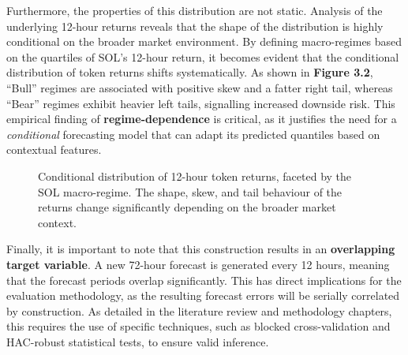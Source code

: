 \documentclass[
  a4paper,
  DIV=11,
  numbers=noendperiod]{scrreprt}
\begin{document}
Furthermore, the properties of this distribution are not static.
Analysis of the underlying 12-hour returns reveals that the shape of the
distribution is highly conditional on the broader market environment. By
defining macro-regimes based on the quartiles of SOL's 12-hour return,
it becomes evident that the conditional distribution of token returns
shifts systematically. As shown in \textbf{Figure 3.2}, ``Bull'' regimes
are associated with positive skew and a fatter right tail, whereas
``Bear'' regimes exhibit heavier left tails, signalling increased
downside risk. This empirical finding of \textbf{regime-dependence} is
critical, as it justifies the need for a \emph{conditional} forecasting
model that can adapt its predicted quantiles based on contextual
features.

\begin{figure}


\caption{\label{fig-regime-dist}Conditional distribution of 12-hour
token returns, faceted by the SOL macro-regime. The shape, skew, and
tail behaviour of the returns change significantly depending on the
broader market context.}

\end{figure}%

Finally, it is important to note that this construction results in an
\textbf{overlapping target variable}. A new 72-hour forecast is
generated every 12 hours, meaning that the forecast periods overlap
significantly. This has direct implications for the evaluation
methodology, as the resulting forecast errors will be serially
correlated by construction. As detailed in the literature review and
methodology chapters, this requires the use of specific techniques, such
as blocked cross-validation and HAC-robust statistical tests, to ensure
valid inference.
\end{document}
